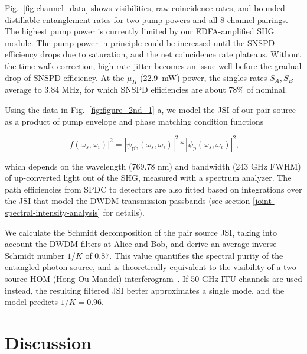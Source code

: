 \documentclass[11pt]{caltech_thesis} %
\begin{document}
Fig.~\ref{fig:channel_data} shows visibilities, raw coincidence rates, and bounded distillable entanglement rates for two pump powers and all 8 channel pairings. The highest pump power is currently limited by our EDFA-amplified SHG module. The pump power in principle could be increased until the SNSPD efficiency drops due to saturation, and the net coincidence rate plateaus. Without the time-walk correction, high-rate jitter becomes an issue well before the gradual drop of SNSPD efficiency. At the $\mu_H$ (22.9~mW) power, the singles rates $S_A, S_B$ average to 3.84 MHz, for which SNSPD efficiencies are about 78\% of nominal.

Using the data in Fig.~\ref{fig:figure_2nd_1} a, we model the JSI of our pair source as a product of pump envelope and phase matching condition functions

$$
|f(\omega_s, \omega_i)|^2 = |\psi_{\mathrm{ph}}\left(\omega_s, \omega_i\right)|^2 *|\psi_p\left(\omega_s, \omega_i\right)|^2,
$$

which depends on the wavelength (769.78 nm) and bandwidth (243 GHz FWHM) of up-converted light out of the SHG, measured with a spectrum analyzer. The path efficiencies from SPDC to detectors are also fitted based on integrations over the JSI that model the DWDM transmission passbands (see section \ref{joint-spectral-intensity-analysis} for details).

We calculate the Schmidt decomposition of the pair source JSI, taking into account the DWDM filters at Alice and Bob, and derive an average inverse Schmidt number $1/K$ of $0.87$. This value quantifies the spectral purity of the entangled photon source, and is theoretically equivalent to the visibility of a two-source HOM (Hong-Ou-Mandel) interferogram~\autocite{mandel1995optical}. If 50 GHz ITU channels are used instead, the resulting filtered JSI better approximates a single mode, and the model predicts $1/K = 0.96$.

\hypertarget{discussion-1}{%
\section{Discussion}\label{discussion-1}}
\end{document}
